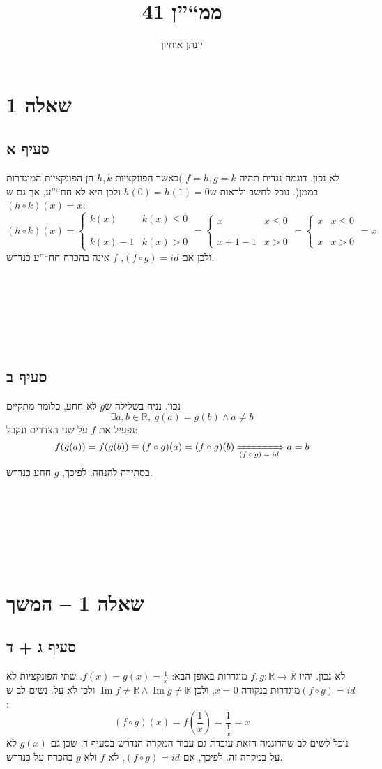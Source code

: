 \documentclass[11pt, oneside]{article}
\title{ממ``''ן 41}
\author{יונתן אוחיון}
\newcommand{\qed}{\R{$\blacksquare$}}
\newcommand{\br}{\\\\\\\\\\\\\\}
\newcommand{\logr}[1]{\xRightarrow[\text{#1}]{}}
\newcommand{\mR}{\mathbb{R}}
\newcommand{\finv}[1]{\frac{1}{#1}}
\DeclareMathOperator{\Ima}{Im}
\begin{document}
\maketitle

\section*{שאלה 1}
\subsection*{סעיף א}
לא נכון. דוגמה נגדית תהיה $f = h, g = k$ )כאשר הפונקציות $h, k$ הן הפונקציות המוגדרות בממן(. נוכל לחשב ולראות ש$h(0) = h(1) = 0$ ולכן היא לא חח``''ע, אך גם ש$(h \circ k)(x) = x$:
\[
(h \circ k)(x)
= \begin{cases}
k(x) & k(x) \le 0\\\\\\
k(x) - 1 & k(x) > 0
\end{cases}
= \begin{cases}
x & x \le 0\\\\\\
x + 1 - 1 & x > 0
\end{cases}
= \begin{cases}
x & x \le 0\\\\\\
x & x > 0
\end{cases} = x
\]
ולכן אם $(f \circ g) = id$, $f$ אינה בהכרח חח``''ע כנדרש.
\br\qed

\subsection*{סעיף ב}
נכון. נניח בשלילה ש$g$ לא חחע, כלומר מתקיים
\[
\exists a, b \in \mR,\ g(a) = g(b) \land a \neq b
\]
נפעיל את $f$ על שני הצדדים ונקבל:
\[
f(g(a)) = f(g(b)) \equiv (f \circ g)(a) = (f \circ g)(b) \logr{$(f \circ g) = id$} a = b
\]
בסתירה להנחה. לפיכך, $g$ חחע כנדרש.
\br\qed
\clearpage

\section*{שאלה 1 -- המשך}
\subsection*{סעיף ג + ד}
לא נכון. יהיו $f, g: \mR \to \mR$ מוגדרות באופן הבא: $f(x) = g(x) = \finv{x}$. שתי הפונקציות לא מוגדרות בנקודה $x = 0$, ולכן $\Ima{f} \neq \mR \land \Ima{g} \neq \mR$ ולכן לא על. נשים לב ש$(f \circ g) = id$:
\[
(f \circ g)(x) = f\left(\finv{x}\right) = \finv{\finv{x}} = x
\]
נוכל לשים לב שהדוגמה הזאת עובדת גם עבור המקרה הנדרש בסעיף ד, שכן גם $g(x)$ לא על במקרה זה. לפיכך, אם $(f \circ g) = id$, לא $f$ ולא $g$ בהכרח על כנדרש.
\br\qed
\end{document}
